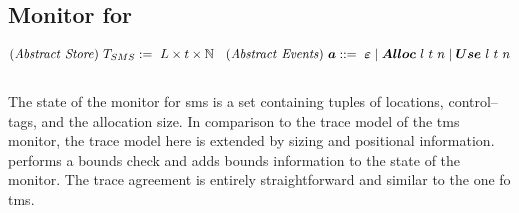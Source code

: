\documentclass[utf8,acmsmall,review,screen,dvipsnames]{acmart}
\begin{document}
\subsection{Monitor for }
\begin{gather*}
  \begin{aligned}
    \mi{(Abstract\ Store)}~\smsmonitor:=\ L\times\sandboxtag\times\mb{N}\hspace{0.33cm}&
    \mi{(Abstract\ Events)}~\absevent\bnfdef\ \absev{\varepsilon} \mid \absev{Alloc\ }\loc\ \sandboxtag\ n \mid \absev{Use\ }\loc\ \sandboxtag\ n \\
  \end{aligned}
\end{gather*}
\begin{center}
  $\;$\\
\end{center}
The state of the monitor for \gls{sms} is a set containing tuples of locations, control--tags, and the allocation size.
In comparison to the trace model of the \gls{tms} monitor, the trace model here is extended by sizing and positional information.
 performs a bounds check and  adds bounds information to the state of the monitor.
The trace agreement is entirely straightforward and similar to the one fo \gls{tms}.
\end{document}

